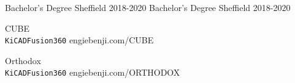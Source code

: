 \documentclass[9pt]{developercv} %
\begin{document}

\begin{Colentrylist}
	\Colentry
		{Bachelor's Degree}
		{Sheffield}
		{\lorem\lorem}
		{2018-2020}
		{Bachelor's Degree}
		{Sheffield}
		{\lorem\lorem}
		{2018-2020}
\end{Colentrylist}



\begin{QRentrylist}
	\QRentry
		{CUBE}
		{\lorem\lorem\lorem\\ \texttt{KiCAD}\slashsep\texttt{Fusion360}}
		{engiebenji.com/CUBE}

	\QRentry
		{Orthodox}
		{\lorem\lorem\\ \texttt{KiCAD}\slashsep\texttt{Fusion360}}
		{engiebenji.com/ORTHODOX}
\end{QRentrylist}
\end{document}
